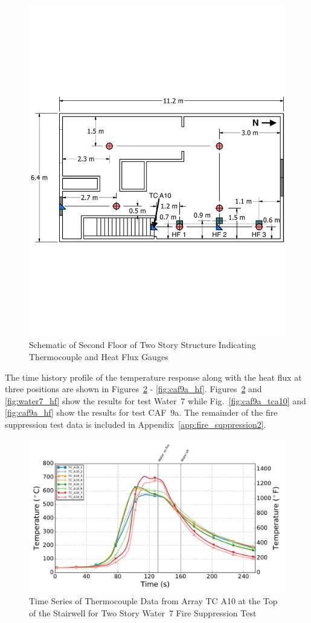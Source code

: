 \documentclass[12pt,oneside]{book}
\begin{document}
\begin{figure}[!ht]
	\includegraphics[width=.9\columnwidth]{../../DelCo_2014_2015/Drawings/PDFs/CAFS/West_Structure_2nd_Floor_Instrumentation2}
	\caption{Schematic of Second Floor of Two Story Structure Indicating Thermocouple and Heat Flux Gauges}
	\label{fig:tcs_hf_second_2story}
\end{figure}

The time history profile of the temperature response along with the heat flux at three positions are shown in Figures~\ref{fig:water7_tca10} - \ref{fig:caf9a_hf}. Figures~\ref{fig:water7_tca10} and \ref{fig:water7_hf} show the results for test Water~7 while Fig.~\ref{fig:caf9a_tca10} and \ref{fig:caf9a_hf} show the results for test CAF~9a. The remainder of the fire suppression test data is included in Appendix~\ref{app:fire_suppression2}.

\begin{figure}[!ht]
	\includegraphics[width=.85\columnwidth]{../Figures/Script_Figures/Test_39_West_061315_TC_A10}
	\caption{Time Series of Thermocouple Data from Array TC A10 at the Top of the Stairwell for Two Story Water~7 Fire Suppression Test}
	\label{fig:water7_tca10}
\end{figure}
\end{document}
